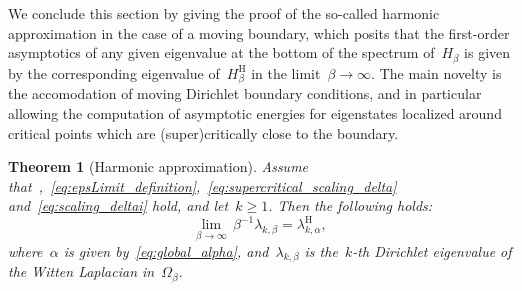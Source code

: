 \documentclass[10pt]{article}
\newcommand{\1}{\mathbbm 1}
\newtheorem{theorem}{Theorem}
\begin{document}
    We conclude this section by giving the proof of the so-called harmonic approximation in the case of a moving boundary, which posits that the first-order asymptotics of any given eigenvalue at the bottom of the spectrum of~$H_\beta$ is given by the corresponding eigenvalue of~$H_\beta^{\mathrm H}$ in the limit~$\beta\to\infty$.
    The main novelty is the accomodation of moving Dirichlet boundary conditions, and in particular allowing the computation of asymptotic energies for eigenstates localized around critical points which are (super)critically close to the boundary.

    \begin{theorem}[Harmonic approximation]
        \label{thm:harm_approx}
        Assume that~,~\eqref{eq:epsLimit_definition},~\eqref{eq:supercritical_scaling_delta} and~\eqref{eq:scaling_deltai} hold, and let~$k\geq 1$. Then the following holds:
        \begin{equation}
            \label{eq:harm_limit}
            \underset{\beta\to\infty}{\lim}\,\beta^{-1}\lambda_{k,\beta} = \lambda_{k,\alpha}^{\mathrm{H}},
        \end{equation}
        where~$\alpha$ is given by~\eqref{eq:global_alpha}, and~$\lambda_{k,\beta}$ is the~$k$-th Dirichlet eigenvalue of the Witten Laplacian in~$\Omega_\beta$.
    \end{theorem}
\end{document}
